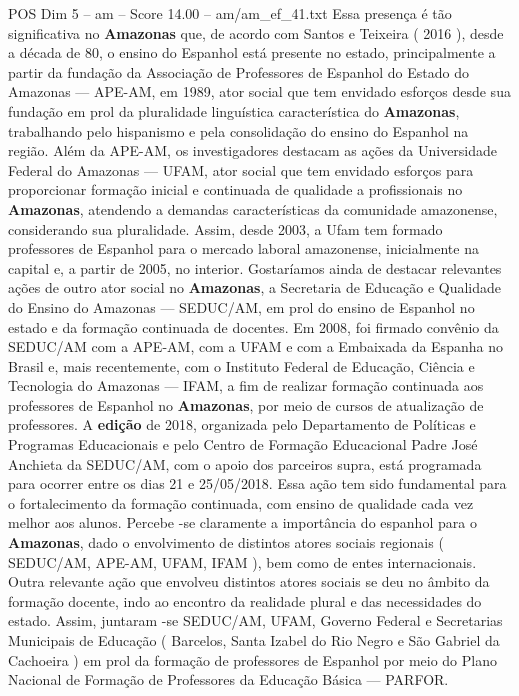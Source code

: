 \begin{textsample}{POS Dim 5 – am – Score 14.00 – am/am\_ef\_41.txt}
Essa presença é tão significativa no \textbf{Amazonas} que, de acordo com Santos e Teixeira ( 2016 ), desde a década de 80, o ensino do Espanhol está presente no estado, principalmente a partir da fundação da Associação de Professores de Espanhol do Estado do Amazonas — APE-AM, em 1989, ator social que tem envidado esforços desde sua fundação em prol da pluralidade linguística característica do \textbf{Amazonas}, trabalhando pelo hispanismo e pela consolidação do ensino do Espanhol na região.
Além da APE-AM, os investigadores destacam as ações da Universidade Federal do Amazonas — UFAM, ator social que tem envidado esforços para proporcionar formação inicial e continuada de qualidade a profissionais no \textbf{Amazonas}, atendendo a demandas características da comunidade amazonense, considerando sua pluralidade.
Assim, desde 2003, a Ufam tem formado professores de Espanhol para o mercado laboral amazonense, inicialmente na capital e, a partir de 2005, no interior.
Gostaríamos ainda de destacar relevantes ações de outro ator social no \textbf{Amazonas}, a Secretaria de Educação e Qualidade do Ensino do Amazonas — SEDUC/AM, em prol do ensino de Espanhol no estado e da formação continuada de docentes.
Em 2008, foi firmado convênio da SEDUC/AM com a APE-AM, com a UFAM e com a Embaixada da Espanha no Brasil e, mais recentemente, com o Instituto Federal de Educação, Ciência e Tecnologia do Amazonas — IFAM, a fim de realizar formação continuada aos professores de Espanhol no \textbf{Amazonas}, por meio de cursos de atualização de professores.
A \textbf{edição} de 2018, organizada pelo Departamento de Políticas e Programas Educacionais e pelo Centro de Formação Educacional Padre José Anchieta da SEDUC/AM, com o apoio dos parceiros supra, está programada para ocorrer entre os dias 21 e 25/05/2018.
Essa ação tem sido fundamental para o fortalecimento da formação continuada, com ensino de qualidade cada vez melhor aos alunos.
Percebe -se claramente a importância do espanhol para o \textbf{Amazonas}, dado o envolvimento de distintos atores sociais regionais ( SEDUC/AM, APE-AM, UFAM, IFAM ), bem como de entes internacionais.
Outra relevante ação que envolveu distintos atores sociais se deu no âmbito da formação docente, indo ao encontro da realidade plural e das necessidades do estado.
Assim, juntaram -se SEDUC/AM, UFAM, Governo Federal e Secretarias Municipais de Educação ( Barcelos, Santa Izabel do Rio Negro e São Gabriel da Cachoeira ) em prol da formação de professores de Espanhol por meio do Plano Nacional de Formação de Professores da Educação Básica — PARFOR.

\end{textsample}
